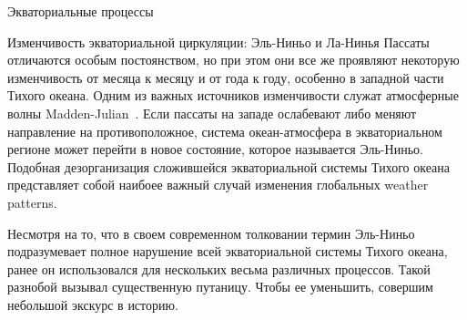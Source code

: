 \begin{chapter}{Экваториальные процессы}
\begin{section}{Изменчивость экваториальной циркуляции: Эль-Ниньо и Ла-Нинья}\label{sec:ElNino}
%
%
Пассаты отличаются особым постоянством, но при этом они все же проявляют
некоторую изменчивость от месяца к месяцу и от года к году, особенно в западной
части Тихого океана. Одним из важных источников изменчивости служат атмосферные 
волны Madden-Julian~\cite{McPhaden:1999}. Если пассаты на западе ослабевают либо
меняют направление на противоположное, система океан-атмосфера в 
экваториальном регионе может перейти в новое состояние, которое называется
Эль-Ниньо. Подобная дезорганизация сложившейся экваториальной системы Тихого 
океана представляет собой наибоее важный случай изменения глобальных
weather patterns.
%

Несмотря на то, что в своем современном толковании термин Эль-Ниньо 
подразумевает полное нарушение всей экваториальной системы Тихого океана, 
ранее он использовался для нескольких весьма различных процессов. Такой
разнобой вызывал существенную путаницу. Чтобы ее уменьшить, совершим 
небольшой экскурс в историю.
%


\end{section}
\end{chapter}
